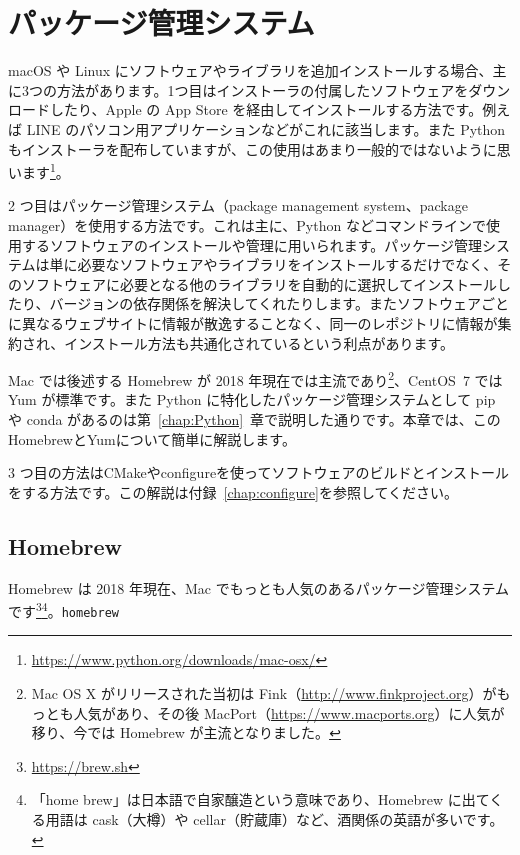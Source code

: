 \setcounter{chapter}{0}
\renewcommand{\thechapter}{\Alph{chapter}}
\setcounter{equation}{0}
\renewcommand{\theequation}{\Alph{chapter}.\arabic{equation}}
\setcounter{figure}{0}
\renewcommand{\thefigure}{\Alph{chapter}.\arabic{figure}}
\setcounter{table}{0}
\renewcommand{\thetable}{\Alph{chapter}.\arabic{table}}
\appendix

\chapter{パッケージ管理システム}
\label{chap:package}
macOS や Linux にソフトウェアやライブラリを追加インストールする場合、主に3つの方法があります。1つ目はインストーラの付属したソフトウェアをダウンロードしたり、Apple の App Store を経由してインストールする方法です。例えば LINE のパソコン用アプリケーションなどがこれに該当します。また Python もインストーラを配布していますが、この使用はあまり一般的ではないように思います\footnote{\url{https://www.python.org/downloads/mac-osx/}}。

2 つ目はパッケージ管理システム（package management system、package manager）を使用する方法です。これは主に、Python などコマンドラインで使用するソフトウェアのインストールや管理に用いられます。パッケージ管理システムは単に必要なソフトウェアやライブラリをインストールするだけでなく、そのソフトウェアに必要となる他のライブラリを自動的に選択してインストールしたり、バージョンの依存関係を解決してくれたりします。またソフトウェアごとに異なるウェブサイトに情報が散逸することなく、同一のレポジトリに情報が集約され、インストール方法も共通化されているという利点があります。

Mac では後述する Homebrew が 2018 年現在では主流であり\footnote{Mac OS X がリリースされた当初は Fink（\url{http://www.finkproject.org}）がもっとも人気があり、その後 MacPort（\url{https://www.macports.org}）に人気が移り、今では Homebrew が主流となりました。}、CentOS~7 では Yum が標準です。また Python に特化したパッケージ管理システムとして pip や conda があるのは第~\ref{chap:Python}~章で説明した通りです。本章では、このHomebrewとYumについて簡単に解説します。

3 つ目の方法はCMakeやconfigureを使ってソフトウェアのビルドとインストールをする方法です。この解説は付録~\ref{chap:configure}を参照してください。

\section{Homebrew}
\label{sec:Homebrew}
Homebrew は 2018 年現在、Mac でもっとも人気のあるパッケージ管理システムです\footnote{\url{https://brew.sh}}\footnote{「home brew」は日本語で自家醸造という意味であり、Homebrew に出てくる用語は cask（大樽）や cellar（貯蔵庫）など、酒関係の英語が多いです。}。\texttt{homebrew}


